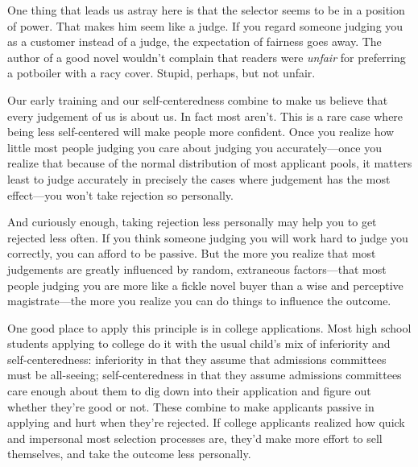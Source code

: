 One thing that leads us astray here is that the selector seems to be in
a position of power. That makes him seem like a judge. If you regard
someone judging you as a customer instead of a judge, the expectation of
fairness goes away. The author of a good novel wouldn't complain that
readers were \emph{unfair} for preferring a potboiler with a racy cover.
Stupid, perhaps, but not unfair.

Our early training and our self-centeredness combine to make us believe
that every judgement of us is about us. In fact most aren't. This is a
rare case where being less self-centered will make people more
confident. Once you realize how little most people judging you care
about judging you accurately---once you realize that because of the
normal distribution of most applicant pools, it matters least to judge
accurately in precisely the cases where judgement has the most
effect---you won't take rejection so personally.

And curiously enough, taking rejection less personally may help you to
get rejected less often. If you think someone judging you will work hard
to judge you correctly, you can afford to be passive. But the more you
realize that most judgements are greatly influenced by random,
extraneous factors---that most people judging you are more like a fickle
novel buyer than a wise and perceptive magistrate---the more you realize
you can do things to influence the outcome.

One good place to apply this principle is in college applications. Most
high school students applying to college do it with the usual child's
mix of inferiority and self-centeredness: inferiority in that they
assume that admissions committees must be all-seeing; self-centeredness
in that they assume admissions committees care enough about them to dig
down into their application and figure out whether they're good or not.
These combine to make applicants passive in applying and hurt when
they're rejected. If college applicants realized how quick and
impersonal most selection processes are, they'd make more effort to sell
themselves, and take the outcome less personally.
